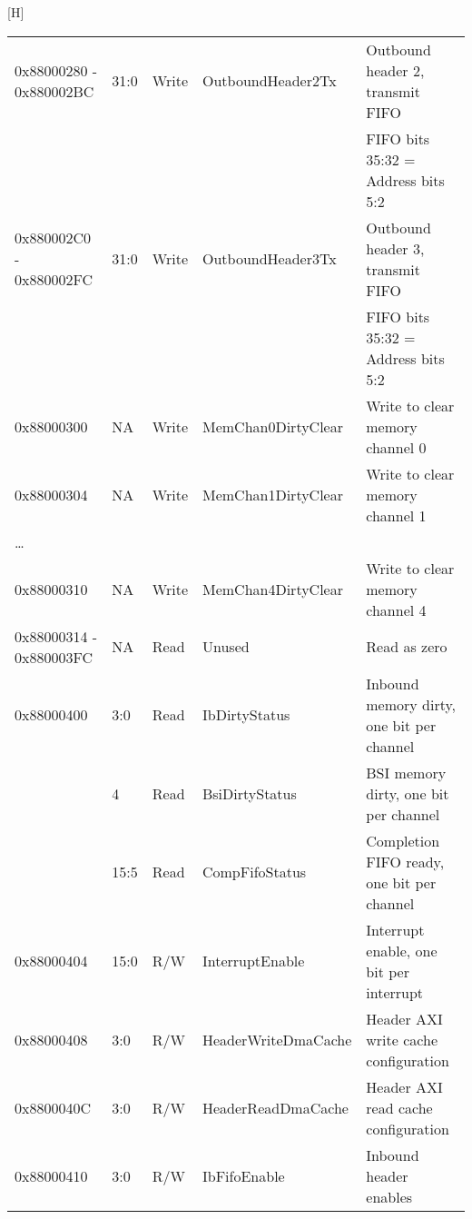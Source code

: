 \documentclass[11pt]{article}
\begin{document}
\begin{center}[H]
\begin{longtable}{| l | l | l | l | l | }
      \hline 0x88000280 - 0x880002BC & 31:0  & Write & OutboundHeader2Tx    & Outbound header 2, transmit FIFO               \\
                                     &       &       &                      & FIFO bits 35:32 = Address bits 5:2             \\
      \hline 0x880002C0 - 0x880002FC & 31:0  & Write & OutboundHeader3Tx    & Outbound header 3, transmit FIFO               \\
                                     &       &       &                      & FIFO bits 35:32 = Address bits 5:2             \\
      \hline 0x88000300              & NA    & Write & MemChan0DirtyClear   & Write to clear memory channel 0                \\
      \hline 0x88000304              & NA    & Write & MemChan1DirtyClear   & Write to clear memory channel 1                \\
             \ldots                  &       &       &                      &                                                \\
      \hline 0x88000310              & NA    & Write & MemChan4DirtyClear   & Write to clear memory channel 4                \\
      \hline 0x88000314 - 0x880003FC & NA    & Read  & Unused               & Read as zero                                   \\
      \hline 0x88000400              & 3:0   & Read  & IbDirtyStatus        & Inbound memory dirty, one bit per channel \\
                                     & 4     & Read  & BsiDirtyStatus       & BSI memory dirty, one bit per channel \\
                                     & 15:5  & Read  & CompFifoStatus       & Completion FIFO ready, one bit per channel \\
      \hline 0x88000404              & 15:0  & R/W   & InterruptEnable      & Interrupt enable, one bit per interrupt        \\
      \hline 0x88000408              & 3:0   & R/W   & HeaderWriteDmaCache  & Header AXI write cache configuration           \\
      \hline 0x8800040C              & 3:0   & R/W   & HeaderReadDmaCache   & Header AXI read cache configuration            \\
      \hline 0x88000410              & 3:0   & R/W   & IbFifoEnable         & Inbound header enables                         \\

\end{longtable}
\end{center}
\end{document}
